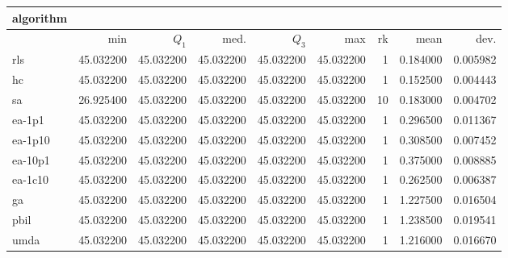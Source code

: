 \begin{tabular}{@{}l*{5}{>{{}}N{2}{2}}>{{}}N{2}{0}N{1}{3}N{1}{3}@{}}
\toprule
{algorithm} &  &  \\
\midrule
& {min} & {$Q_1$} & {med.} & {$Q_3$} & {max} & {rk} & {mean} & {dev.} \\
\midrule
rls & {\color{blue}} 45.032200 & {\color{blue}} 45.032200 & {\color{blue}} 45.032200 & {\color{blue}} 45.032200 & {\color{blue}} 45.032200 & 1 & 0.184000 & 0.005982 \\
 hc & {\color{blue}} 45.032200 & {\color{blue}} 45.032200 & {\color{blue}} 45.032200 & {\color{blue}} 45.032200 & {\color{blue}} 45.032200 & 1 & 0.152500 & 0.004443 \\
 sa & 26.925400 & {\color{blue}} 45.032200 & {\color{blue}} 45.032200 & {\color{blue}} 45.032200 & {\color{blue}} 45.032200 & 10 & 0.183000 & 0.004702 \\
 ea-1p1 & {\color{blue}} 45.032200 & {\color{blue}} 45.032200 & {\color{blue}} 45.032200 & {\color{blue}} 45.032200 & {\color{blue}} 45.032200 & 1 & 0.296500 & 0.011367 \\
 ea-1p10 & {\color{blue}} 45.032200 & {\color{blue}} 45.032200 & {\color{blue}} 45.032200 & {\color{blue}} 45.032200 & {\color{blue}} 45.032200 & 1 & 0.308500 & 0.007452 \\
 ea-10p1 & {\color{blue}} 45.032200 & {\color{blue}} 45.032200 & {\color{blue}} 45.032200 & {\color{blue}} 45.032200 & {\color{blue}} 45.032200 & 1 & 0.375000 & 0.008885 \\
 ea-1c10 & {\color{blue}} 45.032200 & {\color{blue}} 45.032200 & {\color{blue}} 45.032200 & {\color{blue}} 45.032200 & {\color{blue}} 45.032200 & 1 & 0.262500 & 0.006387 \\
 ga & {\color{blue}} 45.032200 & {\color{blue}} 45.032200 & {\color{blue}} 45.032200 & {\color{blue}} 45.032200 & {\color{blue}} 45.032200 & 1 & 1.227500 & 0.016504 \\
 pbil & {\color{blue}} 45.032200 & {\color{blue}} 45.032200 & {\color{blue}} 45.032200 & {\color{blue}} 45.032200 & {\color{blue}} 45.032200 & 1 & 1.238500 & 0.019541 \\
 umda & {\color{blue}} 45.032200 & {\color{blue}} 45.032200 & {\color{blue}} 45.032200 & {\color{blue}} 45.032200 & {\color{blue}} 45.032200 & 1 & 1.216000 & 0.016670 \\
 \bottomrule
\end{tabular}
